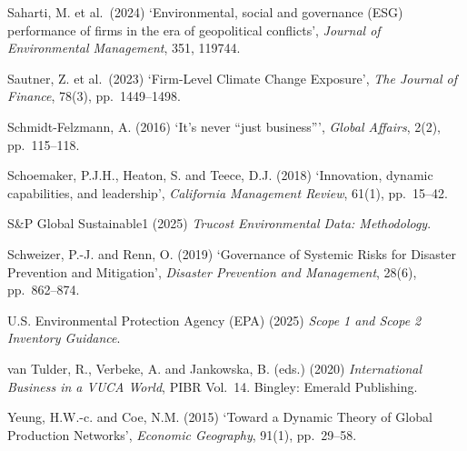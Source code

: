 \documentclass[authoryear,preprint,review,12pt]{elsarticle}
\begin{document}
Saharti, M. et al.\ (2024) `Environmental, social and governance (ESG) performance of firms in the era of geopolitical conflicts', \textit{Journal of Environmental Management}, 351, 119744.

Sautner, Z. et al.\ (2023) `Firm-Level Climate Change Exposure', \textit{The Journal of Finance}, 78(3), pp.\ 1449--1498.

Schmidt-Felzmann, A. (2016) `It's never ``just business''', \textit{Global Affairs}, 2(2), pp.\ 115--118.

Schoemaker, P.J.H., Heaton, S. and Teece, D.J. (2018) `Innovation, dynamic capabilities, and leadership', \textit{California Management Review}, 61(1), pp.\ 15--42.

S\&P Global Sustainable1 (2025) \textit{Trucost Environmental Data: Methodology}.

Schweizer, P.-J. and Renn, O. (2019) `Governance of Systemic Risks for Disaster Prevention and Mitigation', \textit{Disaster Prevention and Management}, 28(6), pp.\ 862--874.

U.S. Environmental Protection Agency (EPA) (2025) \textit{Scope 1 and Scope 2 Inventory Guidance}.

van Tulder, R., Verbeke, A. and Jankowska, B. (eds.) (2020) \textit{International Business in a VUCA World}, PIBR Vol.\ 14. Bingley: Emerald Publishing.

Yeung, H.W.-c. and Coe, N.M. (2015) `Toward a Dynamic Theory of Global Production Networks', \textit{Economic Geography}, 91(1), pp.\ 29--58.
\end{document}
